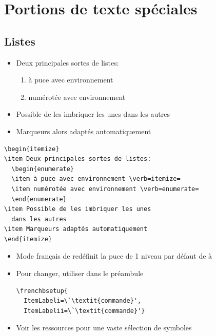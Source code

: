 \section{Portions de texte spéciales}

\subsection{Listes}

\begin{itemize}
\item Deux principales sortes de listes:
  \begin{enumerate}
  \item à puce avec environnement 
  \item numérotée avec environnement 
  \end{enumerate}
\item Possible de les imbriquer les unes dans les autres
\item Marqueurs alors adaptés automatiquement
\end{itemize}

\begin{demo}
\begin{lstlisting}
\begin{itemize}
\item Deux principales sortes de listes:
  \begin{enumerate}
  \item à puce avec environnement \verb=itemize=
  \item numérotée avec environnement \verb=enumerate=
  \end{enumerate}
\item Possible de les imbriquer les unes
  dans les autres
\item Marqueurs adaptés automatiquement
\end{itemize}
\end{lstlisting}
\end{demo}

\begin{information}
  \begin{itemize}
  \item Mode français de  redéfinit la puce de 1{\ier}
    niveau par défaut de {\textbullet} à {\textemdash}
  \item Pour changer, utiliser dans le préambule
\begin{lstlisting}
\frenchbsetup{
  ItemLabeli=\`\textit{commande}',
  ItemLabelii=\`\textit{commande}'}
\end{lstlisting}
  \item Voir les ressources pour une vaste sélection de symboles
  \end{itemize}
\end{information}

